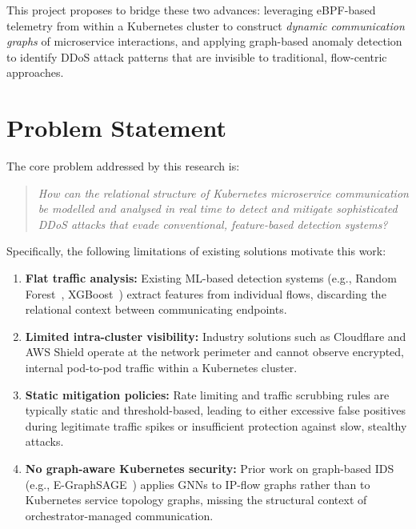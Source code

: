 This project proposes to bridge these two advances: leveraging eBPF-based telemetry from
within a Kubernetes cluster to construct \emph{dynamic communication graphs} of
microservice interactions, and applying graph-based anomaly detection to identify DDoS
attack patterns that are invisible to traditional, flow-centric approaches.

\section{Problem Statement}
\label{sec:problem}

The core problem addressed by this research is:

\begin{quote}
\textit{How can the relational structure of Kubernetes microservice communication be
modelled and analysed in real time to detect and mitigate sophisticated DDoS attacks
that evade conventional, feature-based detection systems?}
\end{quote}

Specifically, the following limitations of existing solutions motivate this work:

\begin{enumerate}
  \item \textbf{Flat traffic analysis:} Existing ML-based detection systems (e.g., Random
  Forest~\cite{rf_ddos}, XGBoost~\cite{xgboost_ids}) extract features from individual
  flows, discarding the relational context between communicating endpoints.

  \item \textbf{Limited intra-cluster visibility:} Industry solutions such as Cloudflare
  and AWS Shield operate at the network perimeter and cannot observe encrypted, internal
  pod-to-pod traffic within a Kubernetes cluster.

  \item \textbf{Static mitigation policies:} Rate limiting and traffic scrubbing rules are
  typically static and threshold-based, leading to either excessive false positives during
  legitimate traffic spikes or insufficient protection against slow, stealthy attacks.

  \item \textbf{No graph-aware Kubernetes security:} Prior work on graph-based IDS
  (e.g., E-GraphSAGE~\cite{lo2022egraphsage}) applies GNNs to IP-flow graphs rather than
  to Kubernetes service topology graphs, missing the structural context of
  orchestrator-managed communication.
\end{enumerate}


